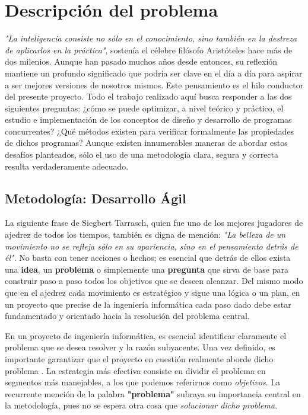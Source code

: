 \chapter{\textbf{Descripción del problema}}\label{chapter:problema}

\textit{"La inteligencia consiste no sólo en el conocimiento, sino también en la destreza de aplicarlos en la práctica"}, sostenía el célebre filósofo Aristóteles hace más de dos milenios. Aunque han pasado muchos años desde entonces, su reflexión mantiene un profundo significado que podría ser clave en el día a día para aspirar a ser mejores versiones de nosotros mismos. Este pensamiento es el hilo conductor del presente proyecto. Todo el trabajo realizado aquí busca responder a las dos siguientes preguntas: ¿cómo se puede optimizar, a nivel teórico y práctico, el estudio e implementación de los conceptos de diseño y desarrollo de programas concurrentes? ¿Qué métodos existen para verificar formalmente las propiedades de dichos programas? Aunque existen innumerables maneras de abordar estos desafíos planteados, sólo el uso de una metodología clara, segura y correcta resulta verdaderamente adecuado.

\section{Metodología: Desarrollo Ágil}
La siguiente frase de Siegbert Tarrasch, quien fue uno de los mejores jugadores de ajedrez de todos los tiempos, también es digna de mención: \textit{"La belleza de un movimiento no se refleja sólo en su apariencia, sino en el pensamiento detrás de él"}. No basta con tener acciones o hechos; es esencial que detrás de ellos exista una \textbf{idea}, un \textbf{problema} o simplemente una \textbf{pregunta} que sirva de base para construir paso a paso todos los objetivos que se deseen alcanzar. Del mismo modo que en el ajedrez cada movimiento es estratégico y sigue una lógica o un plan, en un proyecto que precise de la ingeniería informática cada paso dado debe estar fundamentado y orientado hacia la resolución del problema central.

En un proyecto de ingeniería informática, es esencial identificar claramente el problema que se desea resolver y la razón subyacente. Una vez definido, es importante garantizar que el proyecto en cuestión realmente aborde dicho problema \cite{jj-agile-objetivos}. La estrategia más efectiva consiste en dividir el problema en segmentos más manejables, a los que podemos referirnos como \textit{objetivos}. La recurrente mención de la palabra \textbf{"problema"} subraya su importancia central en la metodología, pues no se espera otra cosa que \textit{solucionar dicho problema}.

